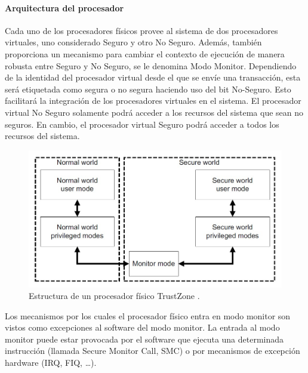 \paragraph{Arquitectura del procesador}
Cada uno de los procesadores físicos provee al sistema de dos procesadores virtuales, uno considerado Seguro y otro No Seguro. Además, también proporciona un mecanismo para cambiar el contexto de ejecución de manera robusta entre Seguro y No Seguro, se le denomina Modo Monitor. Dependiendo de la identidad del procesador virtual desde el que se envíe una transacción, esta será etiquetada como segura o no segura haciendo uso del bit No-Seguro. Esto facilitará la integración de los procesadores virtuales en el sistema. El procesador virtual No Seguro solamente podrá acceder a los recursos del sistema que sean no seguros. En cambio, el procesador virtual Seguro podrá acceder a todos los recursos del sistema. \newline


\begin{figure}
	\centering
	\includegraphics[width=1\textwidth]{imagenes/monitor.jpg}
	\caption{\label{fig1}Estructura de un procesador físico TrustZone \cite{trustzone}.}
\end{figure}


Los mecanismos por los cuales el procesador físico entra en modo monitor son vistos como excepciones al software del modo monitor. La entrada al modo monitor puede estar provocada por el software que ejecuta una determinada instrucción (llamada Secure Monitor Call, SMC) o por mecanismos de excepción hardware (IRQ, FIQ, …). \newline

